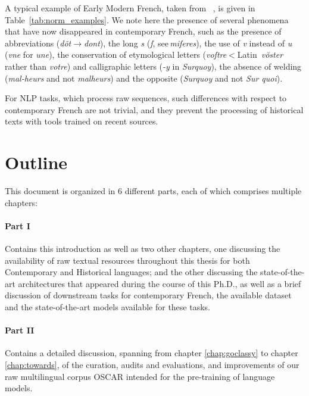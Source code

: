 A typical example of Early Modern French, taken from ~, is given in Table~\ref{tab:norm_examples}. We note here the presence of several phenomena that have now disappeared in contemporary French, such as the presence of abbreviations (\emph{dõt}$\to$\emph{dont}), the long \emph{s} (\emph{ſ}, see\,\emph{miſeres}), the use of \emph{v} instead of \emph{u} (\emph{vne} for \emph{une}), the conservation of etymological letters (\emph{voſtre}$<$Latin~\emph{vŏster} rather than \emph{votre}) and calligraphic letters (\emph{-y} in \emph{Surquoy}), the absence of welding  (\emph{\mbox{mal-heurs}} and not \emph{malheurs}) and the opposite (\emph{Surquoy} and not \emph{Sur quoi}).

For NLP tasks, which process raw sequences, such differences with respect to contemporary French are not trivial, and they prevent the processing of historical texts with tools trained on recent sources.

\section{Outline}

This document is organized in 6 different parts, each of which comprises multiple chapters:

\paragraph{Part I} Contains this introduction as well as two other chapters, one discussing the availability of raw textual resources throughout this thesis for both Contemporary and Historical languages; and the other discussing the state-of-the-art architectures that appeared during the course of this Ph.D., as well as a brief discussion of downstream tasks for contemporary French, the available dataset and the state-of-the-art models available for these tasks.

\paragraph{Part II} Contains a detailed discussion, spanning from chapter \ref{chap:goclassy} to chapter \ref{chap:towards}, of the curation, audits and evaluations, and improvements of our raw multilingual corpus OSCAR \citep{ortiz-suarez-etal-2019-asynchronous,ortiz-suarez-etal-2020-monolingual,abadji-etal-2021-ungoliant,abadji-etal-2022-towards} intended for the pre-training of language models.

